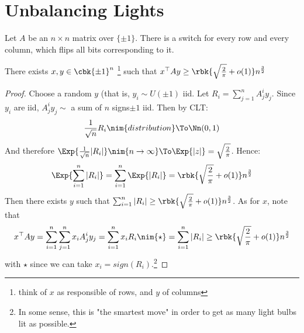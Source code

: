 \documentclass[a4paper, 11pt, oneside]{book}
\begin{document}
\section{Unbalancing Lights}
Let $A$ be an $n\times n$ matrix over $\{\pm 1\}$. There is a switch for every row and every column, which flips all bits corresponding to it.
\begin{thm}
	There exists $x,y\in \cbk{\pm 1}^n$ \footnote{think of $x$ as responsible of rows, and $y$ of columns} such that $x^\top Ay \ge \rbk{\sqrt{\frac{2}{\pi}} + o(1)}n^{\frac32}$
\end{thm}
\begin{proof}
	Choose a random $y$ (that is, $y_i\sim U(\pm 1)$ iid. Let $R_i = \sum_{j=1}^nA^i_jy_j$. Since $y_i$ are iid, $A^i_jy_j \sim $ a sum of $n$ signs$ \pm 1 $ iid. Then by CLT:
	\[
	\frac{1}{\sqrt{n}}R_i\nim{distribution}\To \Nn(0,1)
	\]
	And therefore $\Exp{\frac{1}{\sqrt{n}}|R_i|} \nim{n\to\infty}\To \Exp{|z|} = \sqrt{\frac{2}{\pi}}$. Hence:
	\[
	\Exp{\sum_{i=1}^n |R_i|} = \sum_{i=1}^n \Exp{|R_i|} = \rbk{\sqrt{\frac{2}{\pi}} + o(1)}n^\frac32
	\]
	Then there exists $y$ such that $\sum_{i=1}^n |R_i| \ge \rbk{\sqrt{\frac{2}{\pi}} + o(1)}n^\frac32$. As for $x$, note that 
	\[
	x^\top Ay = \sum_{i=1}^n\sum_{j=1}^n x_iA^i_jy_j = \sum_{i=1}^nx_iR_i \nim{\star}= \sum_{i=1}^n |R_i| \ge \rbk{\sqrt{\frac{2}{\pi}} + o(1)}n^\frac32
	\]
	with $\star$ since we can take $x_i = sign(R_i)$.\footnote{In some sense, this is "the smartest move" in order to get as many light bulbs lit as possible.}
\end{proof}
\end{document}
